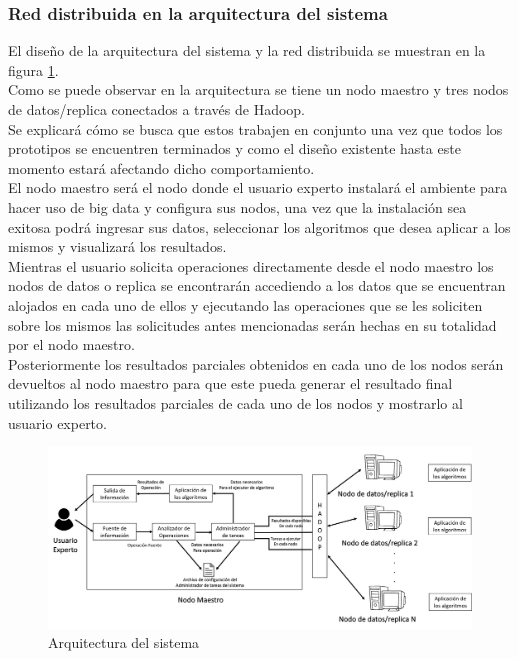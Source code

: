 \subsubsection{Red distribuida en la arquitectura del sistema}
El diseño de la arquitectura del sistema y la red distribuida se muestran en la figura \ref{fig:red}.
\\ 
Como se puede observar en la arquitectura se tiene un nodo maestro y tres nodos de datos/replica conectados a través de Hadoop.
\\
Se explicará cómo se busca que estos trabajen en conjunto una vez que todos los prototipos se encuentren terminados y como el diseño existente hasta este momento estará afectando dicho comportamiento.
\\
El nodo maestro será el nodo donde el usuario experto instalará el ambiente para hacer uso de big data y configura sus nodos, una vez que la instalación sea exitosa podrá ingresar sus datos, seleccionar los algoritmos que desea aplicar a los mismos y visualizará los resultados.
\\
Mientras el usuario solicita operaciones directamente desde el nodo maestro los nodos de datos o replica se encontrarán accediendo a los datos que se encuentran alojados en cada
uno de ellos y ejecutando las operaciones que se les soliciten sobre los mismos las solicitudes antes mencionadas serán hechas en su totalidad por el nodo maestro. 
\\
Posteriormente los resultados parciales obtenidos en cada uno de los nodos serán devueltos al nodo maestro para que este pueda generar el resultado final utilizando los resultados parciales de cada uno de los nodos y mostrarlo al usuario experto.

\begin{figure}[!htbp]
	\hypertarget{fig:red}{\hspace{1pt}}
	\begin{center}
		\includegraphics[width=.7\textwidth]{capitulo3/images/im1.png}
		\caption{Arquitectura del sistema}
		\label{fig:red}
	\end{center}
\end{figure}

